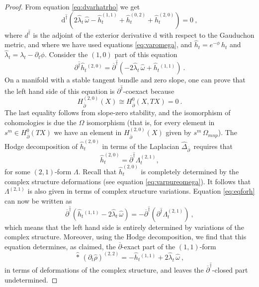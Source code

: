 \documentclass[12pt,a4paper]{article}
\def\bar#1{\overline{#1}}
\let\p=\partial
\def\d{\textrm{d}}
\def\bp{\bar{\partial}}
\theoremstyle{definition}
\begin{document}
\begin{proof}
From equation \eqref{eq:dvarhatrho} we get
\begin{equation*} 
 \d^{\widehat\dagger} (2\hat \lambda_t \,\widehat\omega - \hat h_t^{(1,1)} + \hat h_t^{(0,2)} + \hat h_t^{(2,0)}) = 0~,
 \end{equation*} 
where $d^{\widehat\dagger}$ is the adjoint of the exterior derivative $\d$ with respect to the Gauduchon metric, and where we have used equations \eqref{eq:varomega}, and $\hat h_t = e^{-\phi}\, h_t$ and $\hat\lambda_t = \lambda_t - \p_t\phi$.  
Consider the $(1,0)$ part of this equation
\begin{equation}
\p^{\hat\dagger} \hat h_t{}^{(2,0)} = \bp^{\hat\dagger}( - 2\hat\lambda_t\, \widehat\omega + \hat h_t{}^{(1,1)})~.
\label{eq:eqforh}
\end{equation}
On a manifold with a stable tangent bundle and zero slope, one can prove that
the left hand side of this equation is  $\p^{\hat\dagger}$-coexact because
\[ H_{\bp}^{(2,0)}(X)\cong H_{\bp}^0(X, TX) = 0~.\]
The last equality follows from slope-zero stability, and the isomorphism of cohomologies is due the $\Omega$ isomorphism (that is,
for every element in $s^m\in H_{\bp}^0(TX)$ we have an element in $H_{\bp}^{(2,0)}(X)$ given by $s^m\,\Omega_{mnp}$).
The Hodge decomposition of $\hat h_t^{(2,0)}$ in terms of the Laplacian $\widehat\Delta_{\bp}\,$ requires that
\begin{equation*}
\hat h_t^{(2,0)}=\bp^{\hat\dagger}\Lambda_t^{(2,1)},
\end{equation*}
for some $(2,1)$-form $\Lambda$. Recall that $\hat h_t^{(2,0)}$ is completely determined by the complex structure deformations (see equation \eqref{eq:varpureomega}). It follows that $\Lambda^{(2,1)}$ is also given in terms of complex structure variations.  Equation \eqref{eq:eqforh} can now be written as
\begin{equation*}
\bp^{\hat\dagger} (\hat h_t{}^{(1,1)} - 2\hat\lambda_t\, \widehat\omega ) 
= - \bp^{\hat\dagger} ( 
 \p^{\hat\dagger}\Lambda_t^{(2,1)})~,
\end{equation*}
which means that the left hand side is entirely determined by variations of the complex structure.  Moreover, using the Hodge decomposition,
we find that this equation determines, as claimed, the $\bp$-exact part of the $(1,1)$-form 
\[\hat*\, (\p_t\hat\rho)^{(2,2)} = - \hat h_t{}^{(1,1)} + 2\hat\lambda_t\, \widehat\omega~,\] 
in terms of deformations of the complex structure, and leaves the $\bp^{\hat\dagger}$-closed part undetermined. 
\end{proof}
\end{document}
